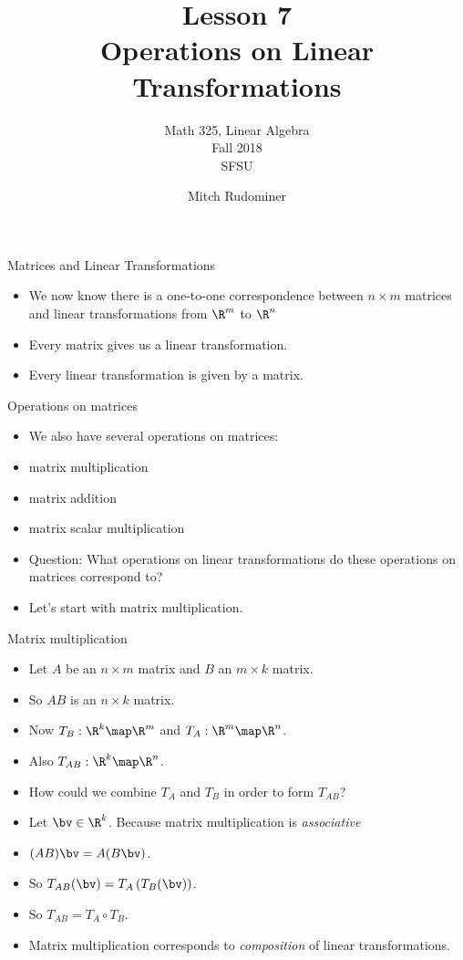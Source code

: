\documentclass{beamer}
\title{Lesson 7 \\ Operations on Linear Transformations}
\subtitle{Math 325, Linear Algebra \\ Fall 2018 \\ SFSU}
\author{Mitch Rudominer}
\date{}
\begin{document}
\begin{frame}
  \titlepage
\end{frame}


\begin{frame}{Matrices and Linear Transformations}

\begin{itemize}
\item We now know there is a one-to-one correspondence between $n\times m$ matrices and linear
transformations from $\R^m$ to $\R^n$
\item Every matrix gives us a linear transformation.
\item Every linear transformation is given by a matrix.
\end{itemize}

\end{frame}

\begin{frame}{Operations on matrices}

\begin{itemize}
\item We also have several operations on matrices:
\item matrix multiplication
\item matrix addition
\item matrix scalar multiplication
\item Question: What operations on linear transformations do these
operations on matrices correspond to?
\item Let's start with matrix multiplication.
\end{itemize}

\end{frame}

\begin{frame}{Matrix multiplication}

\begin{itemize}
\item Let $A$ be an $n\times m$ matrix and $B$ an $m\times k$ matrix.
\item So $A B$ is an $n\times k$ matrix.
\item Now $T_B:\R^k\map\R^m$ and $T_A:\R^m\map\R^n$.
\item Also $T_{AB}:\R^k\map\R^n$.
\item How could we combine $T_A$ and $T_B$ in order to form $T_{AB}$?
\item Let $\bv\in\R^k$. Because matrix multiplication is \emph{associative}
\item $(A B) \bv = A (B \bv)$.
\item So $T_{AB}(\bv) = T_A\left( T_B(\bv) \right)$.
\item So $T_{AB} = T_A \circ T_B$.
\item Matrix multiplication corresponds to \emph{composition} of linear transformations.
\end{itemize}
\end{frame}
\end{document}
